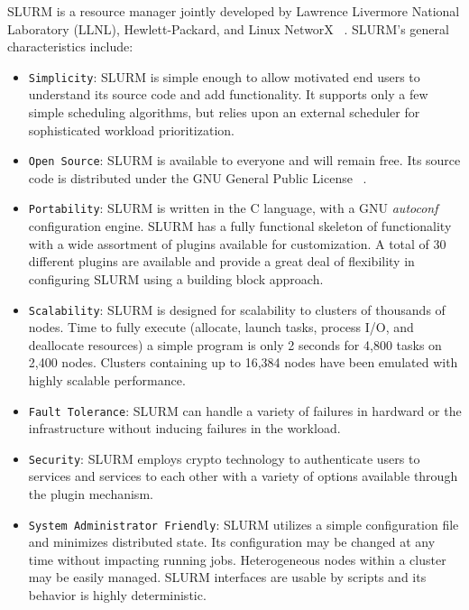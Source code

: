 \documentclass{../common/acm}
\begin{document}
SLURM is a resource manager jointly developed by Lawrence 
Livermore National Laboratory (LLNL), 
Hewlett-Packard, and Linux NetworX
~\cite{SLURM2003,Yoo2003,SlurmWeb}.
SLURM's general characteristics include:

\begin{itemize}
\item {\tt Simplicity}: SLURM is simple enough to allow motivated 
end users to understand its source code and add functionality. 
It supports only a few simple scheduling algorithms, 
but relies upon an external scheduler for sophisticated
workload prioritization.

\item {\tt Open Source}: SLURM is available to everyone and 
will remain free.
Its source code is distributed under the GNU General Public
License
~\cite{GPL2002}.

\item {\tt Portability}: SLURM is written in the C language, 
with a GNU {\em autoconf} configuration engine.
SLURM has a fully functional skeleton of functionality with a
wide assortment of plugins available for customization. 
A total of 30 different plugins are available and provide a 
great deal of flexibility in configuring SLURM using a 
building block approach.

\item {\tt Scalability}: SLURM is designed for scalability to clusters 
of thousands of nodes. Time to fully execute (allocate, launch
tasks, process I/O, and deallocate resources) a simple program
is only 2 seconds for 4,800 tasks on 2,400 nodes. Clusters 
containing up to 16,384 nodes have been emulated with highly 
scalable performance. 

\item {\tt Fault Tolerance}: SLURM can handle a variety of failures
in hardward or the infrastructure without inducing failures in 
the workload.

\item {\tt Security}: SLURM employs crypto technology to authenticate
users to services and services to each other with a variety of options
available through the plugin mechanism.  

\item {\tt System Administrator Friendly}: SLURM utilizes
a simple configuration file and minimizes distributed state.
Its configuration may be changed at any time without impacting running
jobs.  Heterogeneous nodes within a cluster may be easily managed.  SLURM
interfaces are usable by scripts and its behavior is highly deterministic.

\end{itemize}
\end{document}
